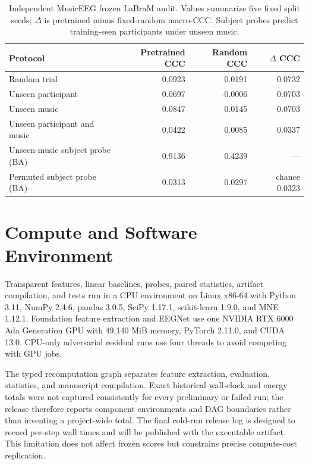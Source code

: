 \begin{table}[t]
  \caption{Independent MusicEEG frozen LaBraM audit. Values summarize five
  fixed split seeds; $\Delta$ is pretrained minus fixed-random macro-CCC.
  Subject probes predict training-seen participants under unseen music.}
  \label{tab:music-labram}
  \centering
  \small
  \setlength{\tabcolsep}{4pt}
  \begin{tabularx}{\linewidth}{@{}Xrrr@{}}
    \toprule
    Protocol & Pretrained CCC & Random CCC & $\Delta$ CCC \\
    \midrule
    Random trial & 0.0923 & 0.0191 & 0.0732 \\
    Unseen participant & 0.0697 & -0.0006 & 0.0703 \\
    Unseen music & 0.0847 & 0.0145 & 0.0703 \\
    Unseen participant and music & 0.0422 & 0.0085 & 0.0337 \\
    \midrule
    Unseen-music subject probe (BA) & 0.9136 & 0.4239 & --- \\
    Permuted subject probe (BA) & 0.0313 & 0.0297 & chance 0.0323 \\
    \bottomrule
  \end{tabularx}
\end{table}

\section{Compute and Software Environment}

Transparent features, linear baselines, probes, paired statistics, artifact
compilation, and tests run in a CPU environment on Linux x86-64 with Python
3.11, NumPy 2.4.6, pandas 3.0.5, SciPy 1.17.1, scikit-learn 1.9.0, and MNE
1.12.1. Foundation feature extraction and EEGNet use one NVIDIA RTX 6000 Ada
Generation GPU with 49,140 MiB memory, PyTorch 2.11.0, and CUDA 13.0. CPU-only
adversarial residual runs use four threads to avoid competing with GPU jobs.

The typed recomputation graph separates feature extraction, evaluation,
statistics, and manuscript compilation. Exact historical wall-clock and energy
totals were not captured consistently for every preliminary or failed run; the
release therefore reports component environments and DAG boundaries rather
than inventing a project-wide total. The final cold-run release log is designed
to record per-step wall times and will be published with the executable
artifact. This limitation does not affect frozen scores but constrains precise
compute-cost replication.

